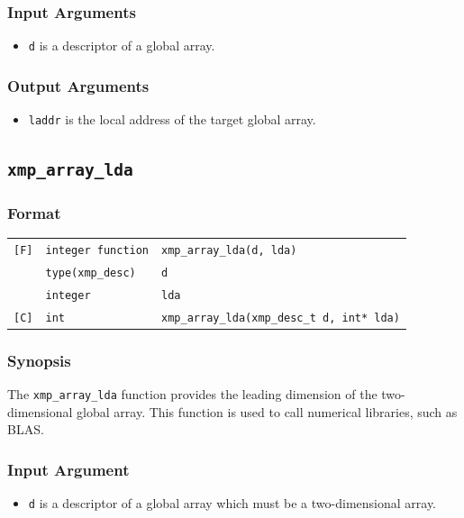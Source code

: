 \subsubsection*{Input Arguments}
\begin{itemize}
 \item {\tt d} is a descriptor of a global array.
\end{itemize}

\subsubsection*{Output Arguments}
\begin{itemize}
 \item {\tt laddr} is the local address of the target global array.
\end{itemize}


\subsection{\tt xmp\_array\_lda}\label{subsec:xmparraylda}

\subsubsection*{Format}
\begin{tabular}{lll}
\verb![F]!& {\tt integer function}& {\tt xmp\_array\_lda(d, lda)}\\
          & {\tt type(xmp\_desc)} & {\tt d}\\
          & {\tt integer} & {\tt lda}\\
\verb![C]!&  {\tt int}& {\tt xmp\_array\_lda(xmp\_desc\_t d, int* lda)}\\
\end{tabular}

\subsubsection*{Synopsis}
The {\tt xmp\_array\_lda} function provides the leading dimension of the two-dimensional global array.
This function is used to call numerical libraries, such as BLAS.

\subsubsection*{Input Argument}
\begin{itemize}
 \item {\tt d} is a descriptor of a global array which must be a two-dimensional array.
\end{itemize}

